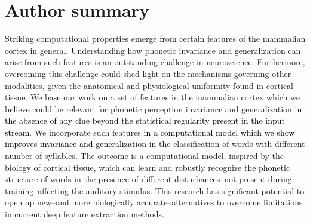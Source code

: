 \documentclass[10pt,letterpaper]{article}
\newcommand{\reviewertwo}[1]{\textcolor{black}{#1}}
\newcommand{\reviewerfour}[1]{\textcolor{black}{#1}}
\begin{document}
\section*{Author summary}


Striking computational properties emerge from certain features of the mammalian cortex in general. Understanding how phonetic invariance and generalization can arise from such features is an outstanding challenge in neuroscience. Furthermore, overcoming this challenge could shed light on the mechanisms governing other modalities, given the anatomical and physiological uniformity found in cortical tissue. We base our work on a set of features in the mammalian cortex which we believe could be relevant for phonetic perception invariance and generalization \reviewerfour{in the absence of any clue beyond the statistical regularity present in the input stream}. We incorporate such features \reviewertwo{in a computational model which we show improves invariance and generalization} in the classification of words with different number of syllables. The outcome is a computational model, inspired by the biology of cortical tissue, which can learn and robustly recognize the phonetic structure of words in the presence of different disturbances--not present during training--affecting the auditory stimulus. This research has significant potential to open up new--and more biologically accurate--alternatives to overcome limitations in current deep feature extraction methods.
\end{document}
